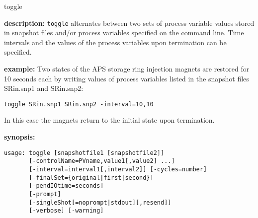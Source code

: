 %
%
\begin{sddsprog}{toggle}
\item {\bf description:}
%
%
\verb+toggle+ alternates between two sets of process variable values stored in 
snapshot files and/or
process variables specified on the command line.
Time intervals and the values of the process variables upon termination can be specified.
\item {\bf example:} 
%
% 
%
Two states of the APS storage ring injection magnets are restored for 10 seconds each by writing
values of process variables listed in the snapshot files SRin.snp1 and SRin.snp2:
\begin{verbatim}
toggle SRin.snp1 SRin.snp2 -interval=10,10
\end{verbatim}
In this case the magnets return to the initial state upon termination.

\item {\bf synopsis:} 
%
%
\begin{verbatim}
usage: toggle [snapshotfile1 [snapshotfile2]]
       [-controlName=PVname,value1[,value2] ...]
       [-interval=interval1[,interval2]] [-cycles=number]
       [-finalSet={original|first|second}]
       [-pendIOtime=seconds]
       [-prompt]
       [-singleShot[=noprompt|stdout][,resend]]
       [-verbose] [-warning]
\end{verbatim}


\end{sddsprog}

